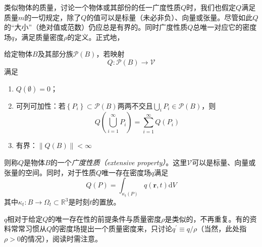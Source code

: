 \documentclass[../main.tex]{subfiles}
\begin{document}
类似物体的质量，讨论一个物体或其部份的任一广度性质$Q$时，我们也假定$Q$满足质量$m$的一切规定，除了$Q$的值可以是标量（未必非负）、向量或张量。尽管如此$Q$的“大小”（绝对值或范数）仍应总是有界的。同时广度性质$Q$总唯一对应它的密度场$q$，满足质量密度$\rho$的定义。正式地，
\begin{definition}[广度性质及其密度场]
    给定物体$B$及其部分族$\mathcal{P}\left(B\right)$，若映射
    \[Q:\mathcal{P}\left(B\right)\rightarrow\mathcal{V}\]
    满足
    \begin{enumerate}
        \item $Q\left(\emptyset\right)=0$；
        \item 可列可加性：若$\left\{P_i\right\}\subset \mathcal{P}\left(B\right)$两两不交且$\bigcup_i P_i\in\mathcal{P}\left(B\right)$，则
              \[Q\left(\bigcup_{i=1}^\infty P_i\right)=\sum_{i=1}^\infty Q\left(P_i\right)\]
        \item 有界：$\left\|Q\left(B\right)\right\|<\infty$
    \end{enumerate}
    则称$Q$是物体$B$的一个\emph{广度性质（extensive property）}。这里$\mathcal{V}$可以是标量、向量或张量的空间。同时，对于性质$Q$唯一存在密度场$q$满足
    \[Q\left(P\right)=\int_{\kappa_t\left(P\right)}q\left(\mathbf{r},t\right)\mathrm{d}V\]
    其中$\kappa_t:B\rightarrow\Omega_t\subset \mathbb{R}^3$是时刻$t$的置放。
\end{definition}
$q$相对于给定$Q$的唯一存在性的前提条件与质量密度$\rho$是类似的，不再重复。有的资料常常习惯从$Q$的密度场提出一个质量密度来，只讨论$q^\prime\equiv q/\rho$（当然，此处指$\rho>0$的情况），阅读时需注意。
\end{document}
